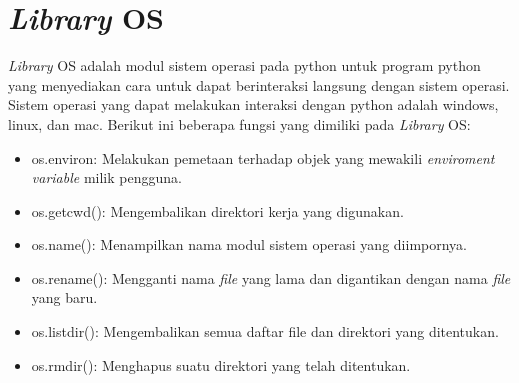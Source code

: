 \section{\textit{Library} OS}
\textit{Library} OS adalah modul sistem operasi pada python untuk program python yang menyediakan cara untuk dapat berinteraksi langsung dengan sistem operasi. Sistem operasi yang dapat melakukan interaksi dengan python adalah windows, linux, dan mac. Berikut ini beberapa fungsi yang dimiliki pada \textit{Library} OS:
\begin{itemize}
	\item os.environ: Melakukan pemetaan terhadap objek yang mewakili \textit{enviroment variable} milik pengguna.
	\item os.getcwd(): Mengembalikan direktori kerja yang digunakan. 
	\item os.name(): Menampilkan nama modul sistem operasi yang diimpornya.
	\item os.rename(): Mengganti nama \textit{file} yang lama dan digantikan dengan nama \textit{file} yang baru.
	\item os.listdir(): Mengembalikan semua daftar file dan direktori yang ditentukan.
	\item os.rmdir(): Menghapus suatu direktori yang telah ditentukan.
\end{itemize}

